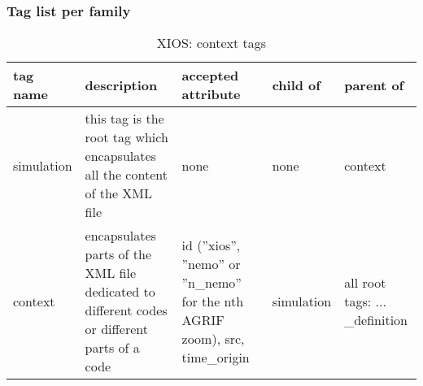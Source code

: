 \documentclass[../main/NEMO_manual]{subfiles}
\begin{document}
\subsubsection{Tag list per family}

\begin{table}
  \begin{tabularx}{\textwidth}{|l|X|X|l|X|}
    \hline
    tag name                                                                                     &
    description                                                                                  &
    accepted attribute                                                                           &
    child of                                                                                     &
    parent of                       \\
    \hline
    \hline
    simulation                                                                                   &
    this tag is the root tag which encapsulates all the content of the XML file                  &
    none                                                                                         &
    none                                                                                         &
    context                         \\
    \hline
    context                                                                                      &
    encapsulates parts of the XML file dedicated to different codes or different parts of a code &
    id (''xios'', ''nemo'' or ''n\_nemo'' for the nth AGRIF zoom), src, time\_origin             &
    simulation                                                                                   &
    all root tags: ... \_definition \\
    \hline
  \end{tabularx}
  \caption{XIOS: context tags}
\end{table}
\end{document}
